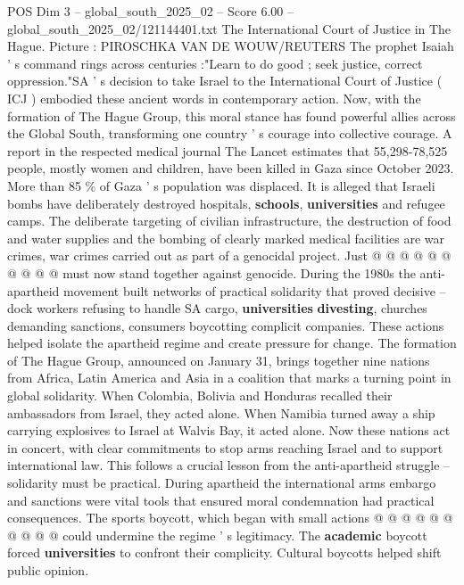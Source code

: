 \begin{textsample}{POS Dim 3 – global\_south\_2025\_02 – Score 6.00 – global\_south\_2025\_02/121144401.txt}  \label{ex:f3_pos_413}
The International Court of Justice in The Hague.
Picture : PIROSCHKA VAN DE WOUW/REUTERS The prophet Isaiah ' s command rings across centuries :"Learn to do good ; seek justice, correct oppression."SA ' s decision to take Israel to the International Court of Justice ( ICJ ) embodied these ancient words in contemporary action.
Now, with the formation of The Hague Group, this moral stance has found powerful allies across the Global South, transforming one country ' s courage into collective courage.
A report in the respected medical journal The Lancet estimates that 55,298-78,525 people, mostly women and children, have been killed in Gaza since October 2023.
More than 85 \% of Gaza ' s population was displaced.
It is alleged that Israeli bombs have deliberately destroyed hospitals, \textbf{schools}, \textbf{universities} and refugee camps.
The deliberate targeting of civilian infrastructure, the destruction of food and water supplies and the bombing of clearly marked medical facilities are war crimes, war crimes carried out as part of a genocidal project.
Just @ @ @ @ @ @ @ @ @ @ must now stand together against genocide.
During the 1980s the anti-apartheid movement built networks of practical solidarity that proved decisive -- dock workers refusing to handle SA cargo, \textbf{universities} \textbf{divesting}, churches demanding sanctions, consumers boycotting complicit companies.
These actions helped isolate the apartheid regime and create pressure for change.
The formation of The Hague Group, announced on January 31, brings together nine nations from Africa, Latin America and Asia in a coalition that marks a turning point in global solidarity.
When Colombia, Bolivia and Honduras recalled their ambassadors from Israel, they acted alone.
When Namibia turned away a ship carrying explosives to Israel at Walvis Bay, it acted alone.
Now these nations act in concert, with clear commitments to stop arms reaching Israel and to support international law.
This follows a crucial lesson from the anti-apartheid struggle -- solidarity must be practical.
During apartheid the international arms embargo and sanctions were vital tools that ensured moral condemnation had practical consequences.
The sports boycott, which began with small actions @ @ @ @ @ @ @ @ @ @ could undermine the regime ' s legitimacy.
The \textbf{academic} boycott forced \textbf{universities} to confront their complicity.
Cultural boycotts helped shift public opinion.

\end{textsample}
